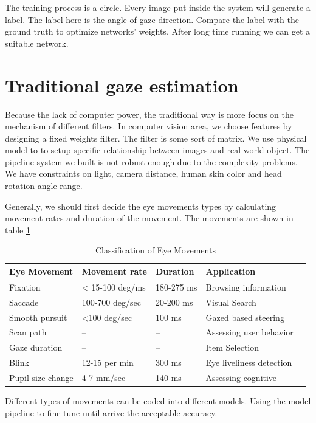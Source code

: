 \documentclass[senior]{IPSstyle}
\begin{document}
The training process is a circle.
Every image put inside the system will generate a label.
The label here is the angle of gaze direction.
Compare the label with the ground truth to optimize networks' weights.
After long time running we can get a suitable network.

\section{Traditional gaze estimation}
Because the lack of computer power, the traditional way is more focus on the mechanism of different filters.
In computer vision area, we choose features by designing a fixed weights filter.
The filter is some sort of matrix.
We use physical model to to setup specific relationship between images and real world object.
The pipeline system we built is not robust enough due to the complexity problems.
We have constraints on light, camera distance, human skin color and head rotation angle range.

Generally, we should first decide the eye movements types by calculating movement rates and duration of the movement.
The movements are shown in table \ref{tab:eye_movements}
\begin{table}[htbp]
    \centering
    \begin{tabular}{|l|l|l|l|l|}
        \hline
         Eye Movement & Movement rate & Duration  & Application \\\hline
         Fixation & < 15-100 deg/ms & 180-275 ms  & Browsing information\\\hline
         Saccade & 100-700 deg/sec & 20-200 ms &  Visual Search\\ \hline
         Smooth pursuit & <100 deg/sec & 100 ms &  Gazed based steering \\ \hline
         Scan path & -- & -- & Assessing user behavior \\ \hline
         Gaze duration& -- & -- &  Item Selection \\ \hline
         Blink & 12-15 per min & 300 ms &  Eye liveliness detection \\ \hline
         Pupil size change & 4-7 mm/sec & 140 ms & Assessing cognitive\\ \hline
    \end{tabular}
    \caption{Classification of Eye Movements}
    \label{tab:eye_movements}
\end{table}
Different types of movements can be coded into different models.
Using the model pipeline to fine tune until arrive the acceptable accuracy.
\end{document}
